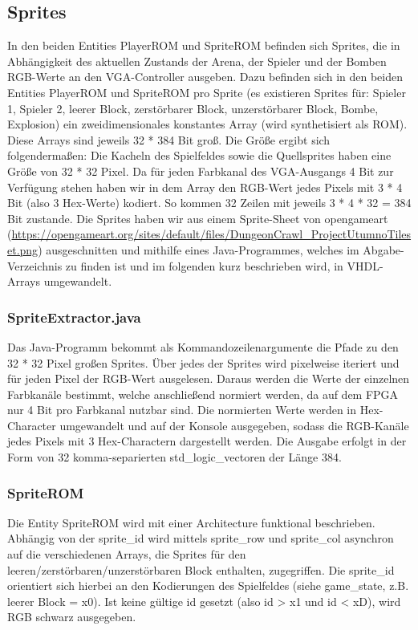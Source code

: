 \documentclass[parskip=full]{scrartcl}
\begin{document}
			\subsection{Sprites}
				In den beiden Entities PlayerROM und SpriteROM befinden sich Sprites, die in Abhängigkeit des aktuellen Zustands der Arena, der Spieler und der Bomben RGB-Werte an den VGA-Controller ausgeben. Dazu befinden sich in den beiden Entities PlayerROM und SpriteROM pro Sprite (es existieren Sprites für: Spieler 1, Spieler 2, leerer Block, zerstörbarer Block, unzerstörbarer Block, Bombe, Explosion) ein zweidimensionales konstantes Array (wird synthetisiert als ROM). Diese Arrays sind jeweils 32 * 384 Bit groß. \newline
				Die Größe ergibt sich folgendermaßen: Die Kacheln des Spielfeldes sowie die Quellsprites haben eine Größe von 32 * 32 Pixel. Da für jeden Farbkanal des VGA-Ausgangs 4 Bit zur Verfügung stehen haben wir in dem Array den RGB-Wert jedes Pixels mit 3 * 4 Bit (also 3 Hex-Werte) kodiert. So kommen 32 Zeilen mit jeweils 
				3 * 4 * 32 = 384 Bit zustande. \newline
				Die Sprites haben wir aus einem Sprite-Sheet von opengameart (\url{https://opengameart.org/sites/default/files/DungeonCrawl_ProjectUtumnoTileset.png}) ausgeschnitten und mithilfe eines Java-Programmes, welches im Abgabe-Verzeichnis zu finden ist und im folgenden kurz beschrieben wird, in VHDL-Arrays umgewandelt.
				\subsubsection{SpriteExtractor.java}
					Das Java-Programm bekommt als Kommandozeilenargumente die Pfade zu den 32 * 32 Pixel großen Sprites. Über jedes der Sprites wird pixelweise iteriert und für jeden Pixel der RGB-Wert ausgelesen. Daraus werden die Werte der einzelnen Farbkanäle bestimmt, welche anschließend normiert werden, da auf dem FPGA nur 4 Bit pro Farbkanal nutzbar sind. Die normierten Werte werden in Hex-Character umgewandelt und auf der Konsole ausgegeben, sodass die RGB-Kanäle jedes Pixels mit 3 Hex-Charactern  dargestellt werden. Die Ausgabe erfolgt in der Form von 32 komma-separierten std\_logic\_vectoren der Länge 384.
				\subsubsection{SpriteROM}
					Die Entity SpriteROM wird mit einer Architecture funktional beschrieben. Abhängig von der sprite\_id wird mittels sprite\_row und sprite\_col asynchron auf die verschiedenen Arrays, die Sprites für den leeren/zerstörbaren/unzerstörbaren Block enthalten, zugegriffen. Die sprite\_id orientiert sich hierbei an den Kodierungen des Spielfeldes (siehe game\_state, z.B. leerer Block = x0). Ist keine gültige id gesetzt (also id > x1 und id < xD), wird RGB schwarz ausgegeben.
\end{document}
